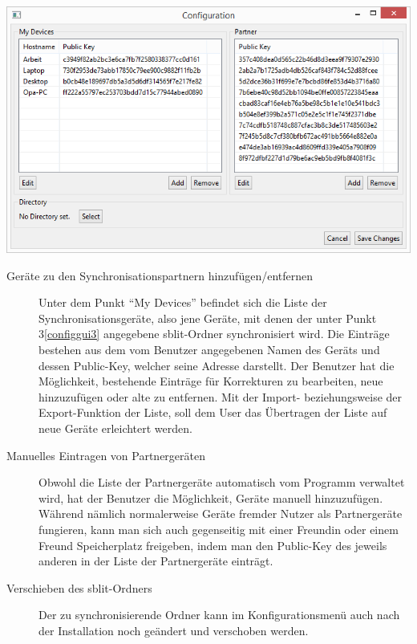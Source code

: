 \includegraphics[]{images/config_gui.png}

\begin{description}
	
	\item[{Geräte zu den Synchronisationspartnern hinzufügen/entfernen}]
		Unter dem Punkt “My Devices” befindet sich die Liste der Synchronisationsgeräte, also jene Geräte, mit denen der unter Punkt 3\ref{configgui3} angegebene sblit-Ordner synchronisiert wird. Die Einträge bestehen aus dem vom Benutzer angegebenen Namen des Geräts und dessen Public-Key, welcher seine Adresse darstellt.
Der Benutzer hat die Möglichkeit, bestehende Einträge für Korrekturen zu bearbeiten, neue hinzuzufügen oder alte zu entfernen.
Mit der Import- beziehungsweise der Export-Funktion der Liste, soll dem User das Übertragen der Liste auf neue Geräte erleichtert werden.

	\item[{Manuelles Eintragen von Partnergeräten}]
		Obwohl die Liste der Partnergeräte automatisch vom Programm verwaltet wird, hat der Benutzer die Möglichkeit, Geräte manuell hinzuzufügen. Während nämlich normalerweise Geräte fremder Nutzer als Partnergeräte fungieren, kann man sich auch gegenseitig mit einer Freundin oder einem Freund Speicherplatz freigeben, indem man den Public-Key des jeweils anderen in der Liste der Partnergeräte einträgt.

	\item[{Verschieben des sblit-Ordners}]
		Der zu synchronisierende Ordner kann im Konfigurationsmenü auch nach der Installation noch geändert und verschoben werden.

\end{description}